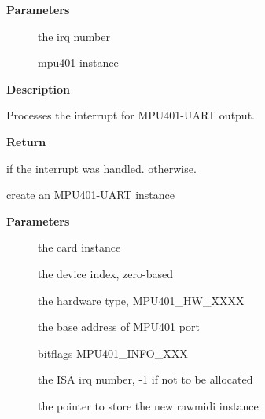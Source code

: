 \documentclass[a4paper,8pt,english]{sphinxmanual}
\begin{document}
\textbf{Parameters}
\begin{description}
\item[{}] \leavevmode
the irq number

\item[{}] \leavevmode
mpu401 instance

\end{description}

\textbf{Description}

Processes the interrupt for MPU401-UART output.

\textbf{Return}

 if the interrupt was handled.  otherwise.

\begin{fulllineitems}
\label{sound/kernel-api/alsa-driver-api:c.snd_mpu401_uart_new}
create an MPU401-UART instance

\end{fulllineitems}


\textbf{Parameters}
\begin{description}
\item[{}] \leavevmode
the card instance

\item[{}] \leavevmode
the device index, zero-based

\item[{}] \leavevmode
the hardware type, MPU401\_HW\_XXXX

\item[{}] \leavevmode
the base address of MPU401 port

\item[{}] \leavevmode
bitflags MPU401\_INFO\_XXX

\item[{}] \leavevmode
the ISA irq number, -1 if not to be allocated

\item[{}] \leavevmode
the pointer to store the new rawmidi instance

\end{description}
\end{document}
